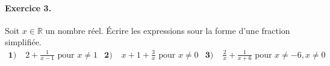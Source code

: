 \documentclass[11pt]{article}
\begin{document}
\paragraph{Exercice 3.} Soit $x\in\mathbb{R}$ un nombre réel. Écrire les
expressions sour la forme d'une fraction simplifiée.
\begin{align*}
  \textbf{1)}\; & 2+\frac{1}{x-1}\text{ pour }x\neq1 &
  \textbf{2)}\; & x+1+\frac{3}{x}\text{ pour }x\neq0 &
  \textbf{3)}\; & \frac{2}{x}+\frac{1}{x+6}\text{ pour }x\neq-6, x\neq0 &
\end{align*}
\end{document}
